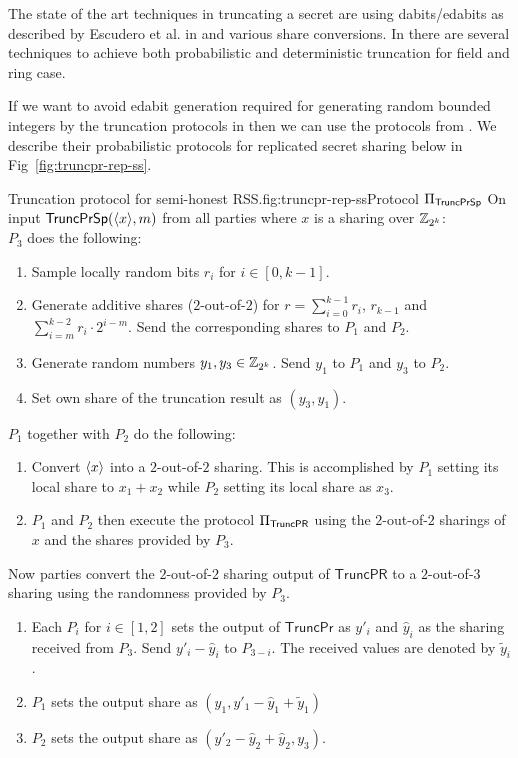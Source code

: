 \documentclass[11pt]{article}
\begin{document}
\noindent
The state of the art techniques in truncating a secret are using
dabits/edabits as described by Escudero et al. in \cite{C:EGKRS20} and
various share conversions. In \cite{C:EGKRS20} there are several techniques
to achieve both probabilistic and deterministic truncation for field and ring
case.

If we want to avoid edabit generation required for generating random bounded integers
by the truncation protocols in \cite{C:EGKRS20} then we can use the protocols from
\cite{PoPETS:DalEscKel20}. We describe their probabilistic protocols for replicated secret
sharing below in Fig~\ref{fig:truncpr-rep-ss}.

\begin{Boxfig}{Truncation protocol for semi-honest
RSS.}{fig:truncpr-rep-ss}{Protocol $\Pi_\mathsf{\mathsf{TruncPrSp}}$}
On input
$\mathsf{TruncPrSp}(\langle {x} \rangle, m)$ from all parties where $x$ is a sharing
over $\mathbb{Z}_{2^k}$: \\
$P_3$ does the following:
  \begin{enumerate}
    \item Sample locally random bits $r_i$ for $i \in [0, k-1]$.
    \item Generate additive shares ($2$-out-of-$2$) for $r = \sum_{i=0}^{k-1}r_i$,
    $r_{k-1}$ and $\sum_{i=m}^{k-2} r_i \cdot 2^{i-m}$. Send the corresponding shares
    to $P_1$ and $P_2$.
    \item Generate random numbers $y_1, y_3 \in \mathbb{Z}_{2^k}$. Send $y_1$ to
    $P_1$ and $y_3$ to $P_2$.
    \item Set own share of the truncation result as $(y_3, y_1)$.
 \end{enumerate}
$P_1$ together with $P_2$ do the following:

\begin{enumerate}
   \item Convert $\langle {x} \rangle$ into a $2$-out-of-$2$ sharing. This is
   accomplished by $P_1$ setting its local share to $x_1 + x_2$ while $P_2$
   setting its local share as $x_3$.
   \item $P_1$ and $P_2$ then execute the protocol $\Pi_\mathsf{\mathsf{TruncPR}}$
   using the $2$-out-of-$2$ sharings of $x$ and the shares provided by $P_3$.
\end{enumerate}
 Now parties convert the $2$-out-of-$2$ sharing output of
 $\mathsf{TruncPR}$ to a $2$-out-of-$3$
 sharing using the randomness provided by $P_3$.
 \begin{enumerate}
   \item Each $P_i$ for $i \in [1, 2]$ sets the output of $\mathsf{TruncPr}$
   as $y'_i$ and $\hat{y}_i$ as the sharing received from $P_3$. Send $y'_i -
   \hat{y}_i$ to $P_{3-i}$. The received values are denoted by $\tilde{y}_i$.
   \item $P_1$ sets the output share as $(y_1, y'_1 - \hat{y}_1 + \tilde{y}_1)$
   \item $P_2$ sets the output share as $(y'_2 - \hat{y}_2 + \widehat{y}_2, y_3)$.
 \end{enumerate}
\end{Boxfig}
\end{document}
